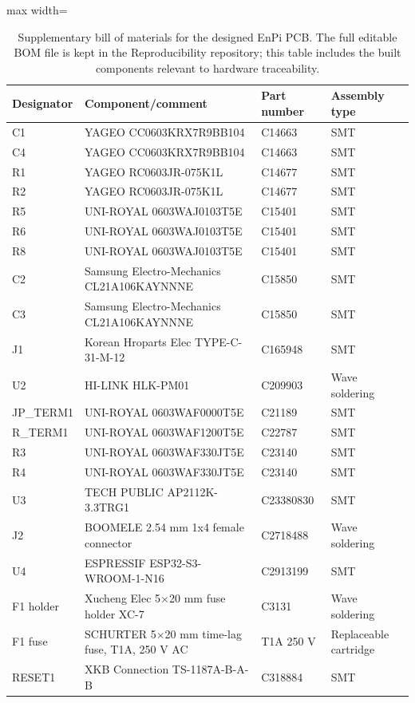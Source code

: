 \documentclass[technologies,article,submit,pdftex,moreauthors]{Definitions/mdpi}
\begin{document}
\begin{table}[H]
\caption{Supplementary bill of materials for the designed EnPi PCB. The full editable BOM file is kept in the Reproducibility repository; this table includes the built components relevant to hardware traceability.}
\label{tab:S4}
\centering
\scriptsize
\begin{adjustbox}{max width=\textwidth}
\begin{tabular}{p{}p{}p{}p{}}
\toprule
Designator & Component/comment & Part number & Assembly type \\
\midrule
C1 & YAGEO CC0603KRX7R9BB104 & C14663 & SMT \\
C4 & YAGEO CC0603KRX7R9BB104 & C14663 & SMT \\
R1 & YAGEO RC0603JR-075K1L & C14677 & SMT \\
R2 & YAGEO RC0603JR-075K1L & C14677 & SMT \\
R5 & UNI-ROYAL 0603WAJ0103T5E & C15401 & SMT \\
R6 & UNI-ROYAL 0603WAJ0103T5E & C15401 & SMT \\
R8 & UNI-ROYAL 0603WAJ0103T5E & C15401 & SMT \\
C2 & Samsung Electro-Mechanics CL21A106KAYNNNE & C15850 & SMT \\
C3 & Samsung Electro-Mechanics CL21A106KAYNNNE & C15850 & SMT \\
J1 & Korean Hroparts Elec TYPE-C-31-M-12 & C165948 & SMT \\
U2 & HI-LINK HLK-PM01 & C209903 & Wave soldering \\
JP\_TERM1 & UNI-ROYAL 0603WAF0000T5E & C21189 & SMT \\
R\_TERM1 & UNI-ROYAL 0603WAF1200T5E & C22787 & SMT \\
R3 & UNI-ROYAL 0603WAF330JT5E & C23140 & SMT \\
R4 & UNI-ROYAL 0603WAF330JT5E & C23140 & SMT \\
U3 & TECH PUBLIC AP2112K-3.3TRG1 & C23380830 & SMT \\
J2 & BOOMELE 2.54 mm 1x4 female connector & C2718488 & Wave soldering \\
U4 & ESPRESSIF ESP32-S3-WROOM-1-N16 & C2913199 & SMT \\
F1 holder & Xucheng Elec 5$\times$20 mm fuse holder XC-7 & C3131 & Wave soldering \\
F1 fuse & SCHURTER 5$\times$20 mm time-lag fuse, T1A, 250 V AC & T1A 250 V & Replaceable cartridge \\
RESET1 & XKB Connection TS-1187A-B-A-B & C318884 & SMT \\

\end{tabular}
\end{adjustbox}
\end{table}
\end{document}
